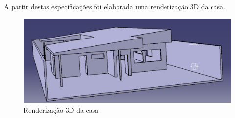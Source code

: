 A partir destas especificações foi elaborada uma renderização 3D da casa.
\newpage

\begin{figure}[H]
  \begin{center}
	\includegraphics[keepaspectratio,scale=0.5,angle=0]{figuras/3d.eps}
	\caption{Renderização 3D da casa}
  \end{center}
\end{figure}













